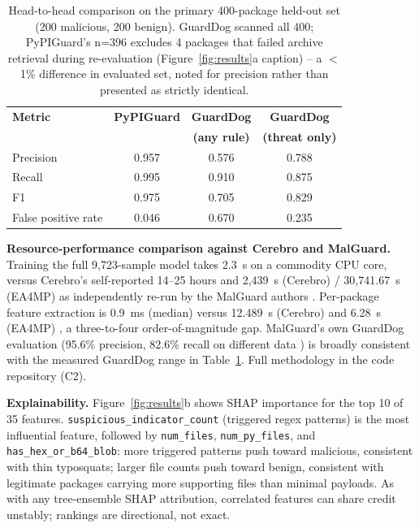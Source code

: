 \documentclass[preprint,12pt, a4paper]{elsarticle}
\begin{document}
\begin{enumerate}
\begin{table}[htbp]
\centering
\small
\begin{tabular}{|l|c|c|c|}
\hline
\textbf{Metric} & \textbf{PyPIGuard} & \textbf{GuardDog} & \textbf{GuardDog} \\
 & & \textbf{(any rule)} & \textbf{(threat only)} \\
\hline
Precision & 0.957 & 0.576 & 0.788 \\
Recall & 0.995 & 0.910 & 0.875 \\
F1 & 0.975 & 0.705 & 0.829 \\
False positive rate & 0.046 & 0.670 & 0.235 \\
\hline
\end{tabular}
\caption{Head-to-head comparison on the primary 400-package held-out set (200 malicious, 200 benign). GuardDog scanned all 400; PyPIGuard's n=396 excludes 4 packages that failed archive retrieval during re-evaluation (Figure~\ref{fig:results}a caption) -- a $<$1\% difference in evaluated set, noted for precision rather than presented as strictly identical.}
\label{tab:guarddog}
\end{table}

\textbf{Resource-performance comparison against Cerebro and MalGuard.} Training the full 9,723-sample model takes 2.3~s on a commodity CPU core, versus Cerebro's self-reported 14--25 hours \cite{cerebro} and 2,439~s (Cerebro) / 30{,}741.67~s (EA4MP) as independently re-run by the MalGuard authors \cite{malguard}. Per-package feature extraction is 0.9~ms (median) versus 12.489~s (Cerebro) and 6.28~s (EA4MP) \cite{malguard}, a three-to-four order-of-magnitude gap. MalGuard's own GuardDog evaluation (95.6\% precision, 82.6\% recall on different data \cite{malguard}) is broadly consistent with the measured GuardDog range in Table~\ref{tab:guarddog}. Full methodology in the code repository (C2).

\textbf{Explainability.} Figure~\ref{fig:results}b shows SHAP importance for the top 10 of 35 features. \texttt{suspicious\_indicator\_count} (triggered regex patterns) is the most influential feature, followed by \texttt{num\_files}, \texttt{num\_py\_files}, and \texttt{has\_hex\_or\_b64\_blob}: more triggered patterns push toward malicious, consistent with thin typosquats; larger file counts push toward benign, consistent with legitimate packages carrying more supporting files than minimal payloads. As with any tree-ensemble SHAP attribution, correlated features can share credit unstably; rankings are directional, not exact.


\end{enumerate}
\end{document}
